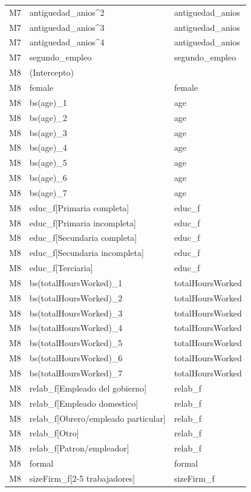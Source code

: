 \begin{longtable}{lll}
M7 & antiguedad\_anios\textasciicircum 2 & antiguedad\_anios \\
M7 & antiguedad\_anios\textasciicircum 3 & antiguedad\_anios \\
M7 & antiguedad\_anios\textasciicircum 4 & antiguedad\_anios \\
M7 & segundo\_empleo & segundo\_empleo \\
M8 & (Intercepto) &  \\
M8 & female & female \\
M8 & bs(age)\_1 & age \\
M8 & bs(age)\_2 & age \\
M8 & bs(age)\_3 & age \\
M8 & bs(age)\_4 & age \\
M8 & bs(age)\_5 & age \\
M8 & bs(age)\_6 & age \\
M8 & bs(age)\_7 & age \\
M8 & educ\_f[Primaria completa] & educ\_f \\
M8 & educ\_f[Primaria incompleta] & educ\_f \\
M8 & educ\_f[Secundaria completa] & educ\_f \\
M8 & educ\_f[Secundaria incompleta] & educ\_f \\
M8 & educ\_f[Terciaria] & educ\_f \\
M8 & bs(totalHoursWorked)\_1 & totalHoursWorked \\
M8 & bs(totalHoursWorked)\_2 & totalHoursWorked \\
M8 & bs(totalHoursWorked)\_3 & totalHoursWorked \\
M8 & bs(totalHoursWorked)\_4 & totalHoursWorked \\
M8 & bs(totalHoursWorked)\_5 & totalHoursWorked \\
M8 & bs(totalHoursWorked)\_6 & totalHoursWorked \\
M8 & bs(totalHoursWorked)\_7 & totalHoursWorked \\
M8 & relab\_f[Empleado del gobierno] & relab\_f \\
M8 & relab\_f[Empleado domestico] & relab\_f \\
M8 & relab\_f[Obrero/empleado particular] & relab\_f \\
M8 & relab\_f[Otro] & relab\_f \\
M8 & relab\_f[Patron/empleador] & relab\_f \\
M8 & formal & formal \\
M8 & sizeFirm\_f[2-5 trabajadores] & sizeFirm\_f \\

\end{longtable}
